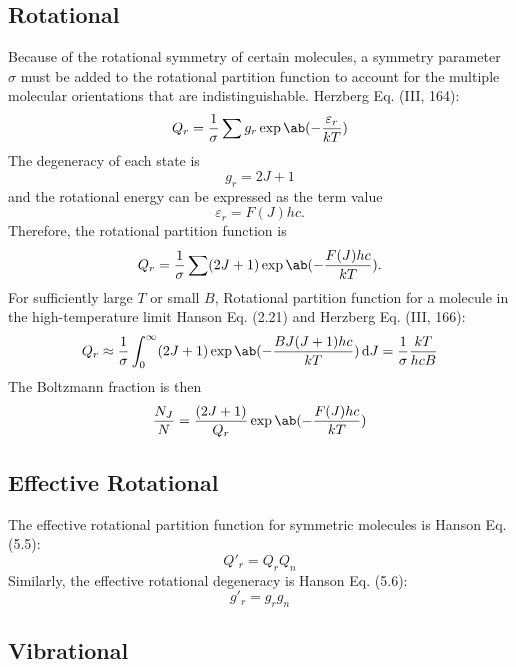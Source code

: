 \documentclass[11pt, twoside, fleqn]{report}
\begin{document}
\subsection{Rotational}
Because of the rotational symmetry of certain molecules, a symmetry parameter $\sigma$ must be added to the rotational partition function to account for the multiple molecular orientations that are indistinguishable.
Herzberg Eq. (III, 164):
\begin{equation*}
    Q_{r} = \frac{1}{\sigma} \sum g_{r}\exp\ab(-\frac{\varepsilon_{r}}{kT})
\end{equation*}
The degeneracy of each state is
\begin{equation*}
    g_{r} = 2J + 1
\end{equation*}
and the rotational energy can be expressed as the term value
\begin{equation*}
    \varepsilon_{r} = F(J)hc.
\end{equation*}
Therefore, the rotational partition function is
\begin{equation*}
    Q_{r} = \frac{1}{\sigma} \sum (2J + 1)\exp\ab(-\frac{F(J)hc}{kT}).
\end{equation*}
For sufficiently large $T$ or small $B$,
Rotational partition function for a molecule in the high-temperature limit Hanson Eq. (2.21) and Herzberg Eq. (III, 166):
\begin{equation*}
    Q_{r} \approx \frac{1}{\sigma} \int_{0}^{\infty} (2J + 1)\exp\ab(-\frac{BJ(J + 1)hc}{kT}) \odif{J} = \frac{1}{\sigma}\frac{kT}{hcB}
\end{equation*}
The Boltzmann fraction is then
\begin{equation*}
    \frac{N_{J}}{N} = \frac{(2J + 1)}{Q_{r}}\exp\ab(-\frac{F(J)hc}{kT})
\end{equation*}

\subsection{Effective Rotational}

The effective rotational partition function for symmetric molecules is Hanson Eq. (5.5):
\begin{equation*}
    Q'_{r} = Q_{r}Q_{n}
\end{equation*}
Similarly, the effective rotational degeneracy is Hanson Eq. (5.6):
\begin{equation*}
    g'_{r} = g_{r}g_{n}
\end{equation*}

\subsection{Vibrational}
\end{document}
